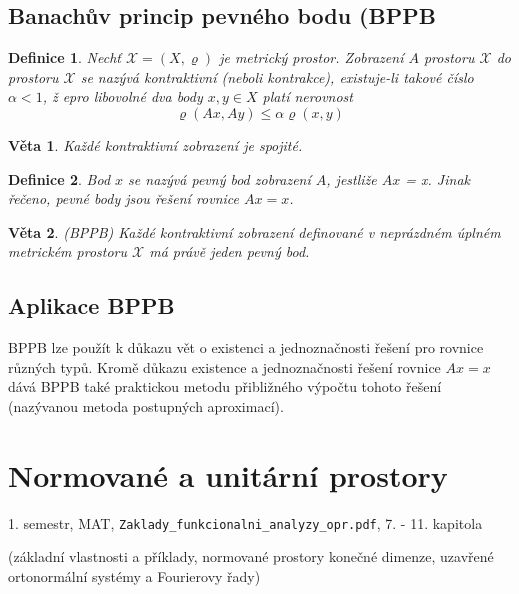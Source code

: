 \documentclass[a4paper, 11pt]{report}
\newtheorem{mydef}{Definice}[chapter]
\newtheorem{veta}{Věta}[chapter]
\begin{document}
\section{Banachův princip pevného bodu (BPPB}

\begin{mydef}
Nechť $\mathcal{X} = (X, \varrho)$ je metrický prostor. Zobrazení $A$ prostoru $\mathcal{X}$ do prostoru $\mathcal{X}$ se nazývá \emph{kontraktivní} (neboli kontrakce), existuje-li takové číslo $\alpha < 1$, ž epro libovolné dva body $x, y \in X$ platí nerovnost
$$\varrho(Ax, Ay) \leq \alpha \varrho(x, y)$$
\end{mydef}

\begin{veta}
Každé kontraktivní zobrazení je spojité.
\end{veta}

\begin{mydef}
Bod $x$ se nazývá \emph{pevný bod} zobrazení $A$, jestliže $Ax$ = x. Jinak řečeno, pevné body jsou řešení rovnice $Ax = x$.
\end{mydef}

\begin{veta}
(BPPB) Každé kontraktivní zobrazení definované v neprázdném úplném metrickém prostoru $\mathcal{X}$ má právě jeden pevný bod.
\end{veta}

\section{Aplikace BPPB}
BPPB lze použít k důkazu vět o existenci a jednoznačnosti řešení pro rovnice různých typů. Kromě důkazu existence a jednoznačnosti řešení rovnice $Ax = x$ dává BPPB také praktickou metodu přibližného výpočtu tohoto řešení (nazývanou metoda postupných aproximací).




\chapter{Normované a unitární prostory} \label{cha:13}

1. semestr, MAT, \texttt{Zaklady\_funkcionalni\_analyzy\_opr.pdf}, 7. -  11. kapitola

(základní vlastnosti a příklady, normované prostory konečné dimenze, uzavřené ortonormální systémy a Fourierovy řady)
\end{document}
